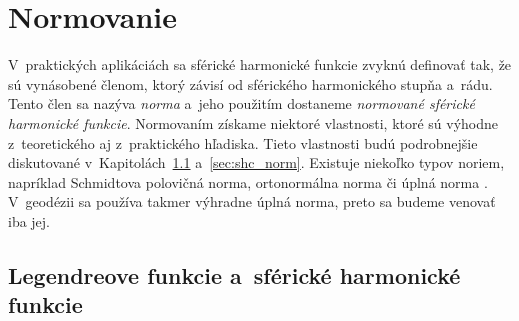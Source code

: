 \documentclass[a4paper,12pt]{book}
\begin{document}
\section{Normovanie}
\label{sec:normalization}

V~praktických aplikáciách sa sférické harmonické funkcie zvyknú definovať tak, 
že sú vynásobené členom, ktorý závisí od sférického harmonického stupňa a~rádu.  
Tento člen sa nazýva \emph{norma} a~jeho použitím dostaneme \emph{normované 
sférické harmonické funkcie}.  Normovaním získame niektoré vlastnosti, ktoré sú 
výhodne z~teoretického aj z~praktického hľadiska.  Tieto vlastnosti budú 
podrobnejšie diskutované v~Kapitolách~\ref{sec:leg_sh_norm} 
a~\ref{sec:shc_norm}.  Existuje niekoľko typov noriem, napríklad Schmidtova 
polovičná norma, ortonormálna norma či úplná norma \parencite{SHTOOLS}.  
V~geodézii sa používa takmer výhradne úplná norma, preto sa budeme venovať iba 
jej.

\subsection{Legendreove funkcie a~sférické harmonické funkcie}
\label{sec:leg_sh_norm}
\end{document}
